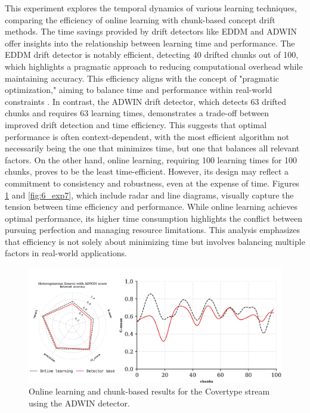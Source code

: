 This experiment explores the temporal dynamics of various learning techniques, comparing the efficiency of online learning with chunk-based concept drift methods. The time savings provided by drift detectors like EDDM and ADWIN offer insights into the relationship between learning time and performance. The EDDM drift detector is notably efficient, detecting 40 drifted chunks out of 100, which highlights a pragmatic approach to reducing computational overhead while maintaining accuracy. This efficiency aligns with the concept of "pragmatic optimization," aiming to balance time and performance within real-world constraints \cite{ref}. In contrast, the ADWIN drift detector, which detects 63 drifted chunks and requires 63 learning times, demonstrates a trade-off between improved drift detection and time efficiency. This suggests that optimal performance is often context-dependent, with the most efficient algorithm not necessarily being the one that minimizes time, but one that balances all relevant factors. On the other hand, online learning, requiring 100 learning times for 100 chunks, proves to be the least time-efficient. However, its design may reflect a commitment to consistency and robustness, even at the expense of time.
Figures \ref{fig:6_exp6} and \ref{fig:6_exp7}, which include radar and line diagrams, visually capture the tension between time efficiency and performance. While online learning achieves optimal performance, its higher time consumption highlights the conflict between pursuing perfection and managing resource limitations. This analysis emphasizes that efficiency is not solely about minimizing time but involves balancing multiple factors in real-world applications.
\begin{figure}[H]
	\centering
	\includegraphics[width=1\linewidth]{6_transfer_learning/figures/exp4.png}
	\caption{Online learning and chunk-based results for the Covertype stream using the ADWIN detector.}
	\label{fig:6_exp6}
\end{figure}

